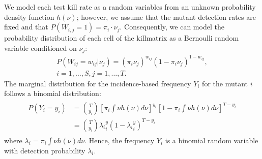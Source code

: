 \documentclass[sigconf,review,anonymous]{acmart}
\begin{document}
We model each test kill rate as a random variables 
from an unknown probability density function $h(\nu)$;
however, we assume that
%
%
the mutant detection rates are fixed and that  %
$P(W_{i,j}=1) = \pi_{i} \cdot \nu_{j}$.
Consequently,
we can model the probability distribution of each cell of the killmatrix 
as a Bernoulli random variable conditioned on $\nu_j$: 
%
\begin{multline*}
        P(W_{ij}=w_{ij}|\nu_j)=(\pi_i \nu_j)^{w_{ij}}(1-\pi_i \nu_j)^{1-w_{ij}}, \\
        i=1, \dots, S, j=1,\dots, T.
\end{multline*}
The marginal distribution for the incidence-based frequency $Y_i$ for the mutant $i$
follows a binomial distribution:
\begin{gather*}
    \begin{split}
    P(Y_i=y_i)&={T \choose y_i}\left[\pi_i\int \nu h(\nu) d\nu\right]^{y_i} \left[1-\pi_i\int \nu h(\nu) d\nu \right]^{T-y_i} \\
    &={T \choose y_i}{\lambda_i}^y_i (1-{\lambda_i}^y_i)^{T-y_i}
    \end{split}
\end{gather*}
where  $\lambda_i=\pi_i \int \nu h(\nu)d\nu$.
Hence, the frequency $Y_i$ is a binomial random variable with detection probability ${\lambda_i}$. %
\end{document}
